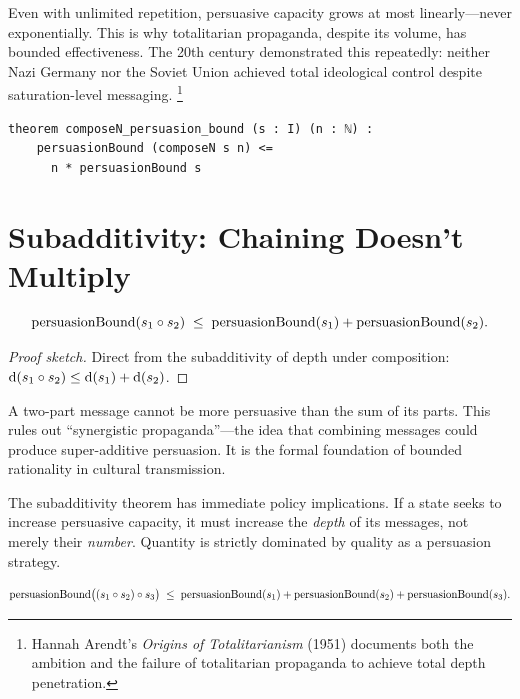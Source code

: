 Even with unlimited repetition, persuasive capacity grows at most
linearly---never exponentially.  This is why totalitarian propaganda,
despite its volume, has bounded effectiveness.  The 20th century
demonstrated this repeatedly: neither Nazi Germany nor the Soviet Union
achieved total ideological control despite saturation-level messaging.%
\footnote{Hannah Arendt's \textit{Origins of Totalitarianism} (1951)
documents both the ambition and the failure of totalitarian propaganda
to achieve total depth penetration.}

\begin{lstlisting}[caption={ComposeN persuasion bound in Lean~4.}]
theorem composeN_persuasion_bound (s : I) (n : ℕ) :
    persuasionBound (composeN s n) <=
      n * persuasionBound s
\end{lstlisting}


\section{Subadditivity: Chaining Doesn't Multiply}
\label{sec:pers-subadditivity}

\begin{theorem}
\label{thm:persuasion-subadditivity}
\[
  \mathrm{persuasionBound}(s_1\circ s_2)
  \;\le\;
  \mathrm{persuasionBound}(s_1) + \mathrm{persuasionBound}(s_2).
\]
\end{theorem}

\begin{proof}[Proof sketch]
Direct from the subadditivity of depth under composition:
$\operatorname{d}(s_1\circ s_2)\le\operatorname{d}(s_1)+\operatorname{d}(s_2)$.
\end{proof}

A two-part message cannot be more persuasive than the sum of its parts.
This rules out ``synergistic propaganda''---the idea that combining
messages could produce super-additive persuasion.  It is the formal
foundation of bounded rationality in cultural transmission.

The subadditivity theorem has immediate policy implications.  If a state
seeks to increase persuasive capacity, it must increase the \emph{depth} of
its messages, not merely their \emph{number}.  Quantity is strictly
dominated by quality as a persuasion strategy.

\begin{theorem}
\label{thm:three-message-bound}
\[
  \mathrm{persuasionBound}\bigl((s_1\circ s_2)\circ s_3\bigr)
  \;\le\;
  \mathrm{persuasionBound}(s_1) +
  \mathrm{persuasionBound}(s_2) +
  \mathrm{persuasionBound}(s_3).
\]
\end{theorem}

